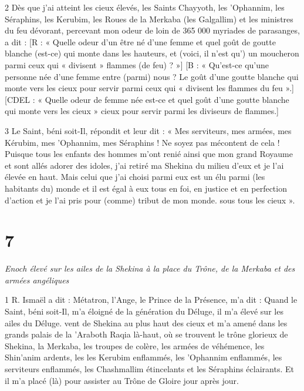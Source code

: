 \par 2 Dès que j'ai atteint les cieux élevés, les Saints Chayyoth, les 'Ophannim, les Séraphins, les Kerubim, les Roues de la Merkaba (les Galgallim) et les ministres du feu dévorant, percevant mon odeur de loin de 365 000 myriades de parasanges, a dit : [R : « Quelle odeur d'un être né d'une femme et quel goût de goutte blanche (est-ce) qui monte dans les hauteurs, et (voici, il n'est qu') un moucheron parmi ceux qui « divisent » flammes (de feu) ? »] [B : « Qu'est-ce qu'une personne née d'une femme entre (parmi) nous ? Le goût d'une goutte blanche qui monte vers les cieux pour servir parmi ceux qui « divisent les flammes du feu ».] [CDEL : « Quelle odeur de femme née est-ce et quel goût d'une goutte blanche qui monte vers les cieux » cieux pour servir parmi les diviseurs de flammes.]

\par 3 Le Saint, béni soit-Il, répondit et leur dit : « Mes serviteurs, mes armées, mes Kérubim, mes 'Ophannim, mes Séraphins ! Ne soyez pas mécontent de cela ! Puisque tous les enfants des hommes m'ont renié ainsi que mon grand Royaume et sont allés adorer des idoles, j'ai retiré ma Shekina du milieu d'eux et je l'ai élevée en haut. Mais celui que j'ai choisi parmi eux est un élu parmi (les habitants du) monde et il est égal à eux tous en foi, en justice et en perfection d'action et je l'ai pris pour (comme) tribut de mon monde. sous tous les cieux ».

\chapter{7}

\par \textit{Enoch élevé sur les ailes de la Shekina à la place du Trône, de la Merkaba et des armées angéliques}

\par 1 R. Ismaël a dit : Métatron, l'Ange, le Prince de la Présence, m'a dit : Quand le Saint, béni soit-Il, m'a éloigné de la génération du Déluge, il m'a élevé sur les ailes du Déluge. vent de Shekina au plus haut des cieux et m'a amené dans les grands palais de la 'Araboth Raqia là-haut, où se trouvent le trône glorieux de Shekina, la Merkaba, les troupes de colère, les armées de véhémence, les Shin'anim ardents, les les Kerubim enflammés, les 'Ophannim enflammés, les serviteurs enflammés, les Chashmallim étincelants et les Séraphins éclairants. Et il m'a placé (là) pour assister au Trône de Gloire jour après jour.


